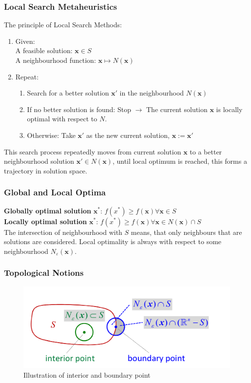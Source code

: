 \documentclass[11pt]{article}
\begin{document}
\subsubsection{Local Search Metaheuristics}
The principle of Local Search Methods:
\begin{enumerate}[label=\roman*.]
	\item Given:\\
	A feasible solution: $\textbf{x} \in S$\\
	A neighbourhood function: $\textbf{x} \mapsto N(\textbf{x})$
	\item Repeat:
	\begin{enumerate}
		\item Search for a better solution $\textbf{x}'$ in the neighbourhood $N(\textbf{x})$
		\item If no better solution is found: Stop $\rightarrow$ The current solution $\textbf{x}$ is locally optimal with respect to $N$.
		\item Otherwise: Take $\textbf{x}'$ as the new current solution, $\textbf{x} := \textbf{x}'$
	\end{enumerate}
\end{enumerate}

This search process repeatedly moves from current solution $\textbf{x}$ to a better neighbourhood solution $\textbf{x}' \in N(\textbf{x})$, until local optimum is reached, this forms a trajectory in solution space.

\subsubsection{Global and Local Optima}
\textbf{Globally optimal solution} $\textbf{x}^*$: $f(x^*)\geq f(\textbf{x})\forall \textbf{x}\in S$\\
\textbf{Locally optimal solution} $\textbf{x}^*$: $f(x^*)\geq f(\textbf{x})\forall \textbf{x}\in N(\textbf{x}) \cap S$\\
The intersection of neighbourhood with $S$ means, that only neighbours that are solutions are considered. Local optimality is always with respect to some neighbourhood $N_\varepsilon(\textbf{x})$.

\subsubsection{Topological Notions}

\begin{figure}[H]
	\centering
	\includegraphics[width=0.8\linewidth, keepaspectratio]{boundary_interior_point}
	\caption{Illustration of interior and boundary point}
	\label{fig:boundaryinteriorpoint}
\end{figure}
\end{document}
